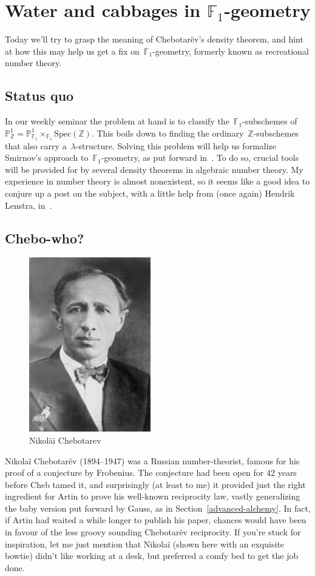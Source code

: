\section{Water and cabbages in $\mathbb{F}_1$-geometry}
Today we'll try to grasp the meaning of Chebotar\"ev's density theorem, and hint at how this may help us get a fix on~$\mathbb{F}_{1}$-geometry, formerly known as recreational number theory.

\subsection{Status quo}

In our weekly seminar the problem at hand is to classify the~$\mathbb{F}_{1}$-subschemes of~$\mathbb{P}^{1}_{\mathbb{Z}}=\mathbb{P}^{1}_{\mathbb{F}_{1}}\times_{\mathbb{F}_{1}}\mathrm{Spec}(\mathbb{Z})$. This boils down to finding the ordinary~$\mathbb{Z}$-subschemes that also carry a~$\lambda$-structure. Solving this problem will help us formalize Smirnov's approach to~$\mathbb{F}_{1}$-geometry, as put forward in~\cite{hurwitz-inequalities-for-number-fields}. To do so, crucial tools will be provided for by several density theorems in algebraic number theory. My experience in number theory is almost nonexistent, so it seems like a good idea to conjure up a post on the subject, with a little help from (once again) Hendrik Lenstra, in~\cite{chebotarev-and-his-density-theorem}.

\subsection{Chebo-who?}

\begin{figure}
  \centering
  \includegraphics[width=.3\textwidth]{chebotarev-density/chebotarev}
  \caption{Nikol\"ai Chebotarev}
\end{figure}

Nikola\"i Chebotar\"ev (1894--1947) was a Russian number-theorist, famous for his proof of a conjecture by Frobenius. The conjecture had been open for 42 years before Cheb tamed it, and surprisingly (at least to me) it provided just the right ingredient for Artin to prove his well-known reciprocity law, vastly generalizing the baby version put forward by Gauss, as in Section~\ref{advanced-alchemy}. In fact, if Artin had waited a while longer to publish his paper, chances would have been in favour of the less groovy sounding Chebotar\"ev reciprocity. If you're stuck for inspiration, let me just mention that Nikola\"i (shown here with an exquisite bowtie) didn't like working at a desk, but preferred a comfy bed to get the job done.


